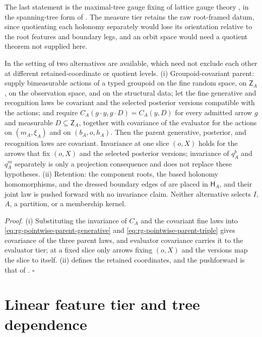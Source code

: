 The last statement is the maximal-tree gauge fixing of lattice gauge theory \citep{Creutz1977}, in
the spanning-tree form of \citet[Sec.~IV A, Eq.~(4.1)]{DelcampDittrich2017PhaseDiagram}. The
measure tier retains the raw root-framed datum, since quotienting each holonomy separately would lose its
orientation relative to the root features and boundary legs, and an orbit space would need a quotient
theorem not supplied here.

In the setting of  two alternatives are available, which need not
exclude each other at different retained-coordinate or quotient levels. (i) Groupoid-covariant parent:
supply bimeasurable actions of a typed groupoid on the fine random space, on $\mathsf Z_A$, on the
observation space, and on the structural data; let the fine generative and recognition laws be covariant
and the selected posterior versions compatible with the actions; and require
$C_A(g\cdot y,g\cdot D)=C_A(y,D)$ for every admitted arrow $g$ and measurable $D\subseteq\mathsf Z_A$,
together with covariance of the evaluator for the actions on $(m_A,\xi_A)$ and on $(b_A,o,h_A)$. Then the
parent generative, posterior, and recognition laws are covariant. Invariance at one slice $(o,X)$ holds for
the arrows that fix $(o,X)$ and the selected posterior versions; invariance of $q^b_A$ and $q^m_A$
separately is only a projection consequence and does not replace these hypotheses. (ii) Retention: the
component roots, the based holonomy homomorphisms, and the dressed boundary edges of
 are placed in $\mathsf H_A$, and their joint law is pushed forward with no
invariance claim. Neither alternative selects $I$, $A$, a partition, or a membership kernel.

\noindent\emph{Proof.}
(i) Substituting the invariance of $C_A$ and the covariant fine laws into
\eqref{eq:rg-pointwise-parent-generative} and \eqref{eq:rg-pointwise-parent-triple} gives covariance of the
three parent laws, and evaluator covariance carries it to the evaluator tier; at a fixed slice only arrows
fixing $(o,X)$ and the versions map the slice to itself. (ii) defines the retained coordinates, and the
pushforward is that of . $\square$

\section{Linear feature tier and tree dependence}

